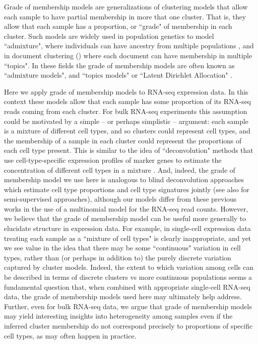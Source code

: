 Grade of membership models are generalizations of clustering models that allow each sample to have partial membership in more that one cluster.
That is, they allow that each sample has a proportion, or ``grade" of membership in each cluster. Such
models are widely used in population genetics to model ``admixture", where individuals can have ancestry from multiple populations \cite{Pritchard2000},
and in document clustering (\cite{Blei2003,Blei2009}) where each document can have membership in multiple ``topics". In these fields
the grade of membership models are often known as ``admixture models", and ``topics models" or ``Latent Dirichlet Allocation" \cite{Blei2003}.

Here we apply grade of membership models to RNA-seq expression data. In this context these models allow that each
 sample has some proportion of its RNA-seq reads coming from each cluster. For bulk RNA-seq experiments this assumption 
could be motivated by a simple -- or perhaps simplistic -- argument: each sample is a mixture of different cell types, and so clusters 
could represent cell types, and the membership of a sample in each cluster could represent the proportions of each cell type present.
This is similar to the idea of ``deconvolution" methods that use cell-type-specific expression profiles of marker genes to estimate the concentration of different cell types in a mixture \cite{}. And, indeed, the grade of membership model we use here is analogous to blind deconvolution approaches \cite{Schwartz2010,Repsilber2010}
 which estimate cell type proportions and cell type signatures jointly (see also \cite{Shen-Orr2010,Qiao2012} for semi-supervised approaches), although 
 our models differ from these previous works in the use of a multinomial model for the RNA-seq read counts. 
However, we believe that the grade of membership model can be useful more generally to elucidate structure in expression data.
For example, in single-cell expression data treating each sample as a ``mixture of cell types" is clearly inappropriate, and yet we see value in the idea
that there may be some ``continuous" variation in cell types, rather than (or perhaps in addition to) the purely discrete variation captured by cluster models. 
Indeed, the extent to which variation among cells can be described in terms of discrete clusters vs more continuous populations
seems a fundamental question that, when combined with appropriate single-cell RNA-seq data, the grade of membership models used here may
ultimately help address. Further, even for bulk RNA-seq data, we argue that grade of membership models may yield interesting insights into heterogeneity among samples
even if the inferred cluster membership do not correspond precisely to proportions of specific cell types, as may often happen in practice.

